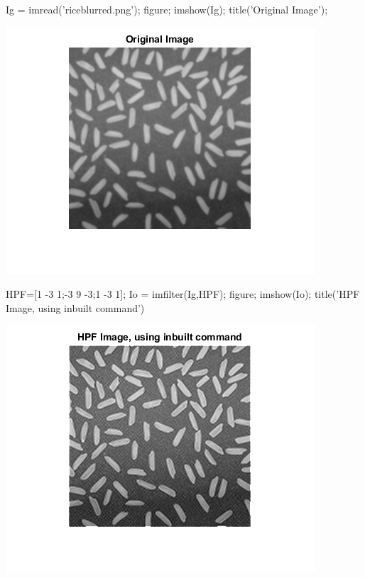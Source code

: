 \documentclass[12pt, onecolumn]{IEEEtran}
\begin{document}
\begin{matlabcode}
Ig =  imread('riceblurred.png'); %
figure; imshow(Ig); title('Original Image'); %
\end{matlabcode}
\begin{center}
\includegraphics[width=\maxwidth{43.753135975915704em}]{figure_16.png}
\end{center}
\begin{matlabcode}
HPF=[1 -3 1;-3 9 -3;1 -3 1]; %
Io = imfilter(Ig,HPF); %
figure; imshow(Io); title('HPF Image, using inbuilt command') %
\end{matlabcode}
\begin{center}
\includegraphics[width=\maxwidth{43.753135975915704em}]{figure_17.png}
\end{center}
\end{document}
